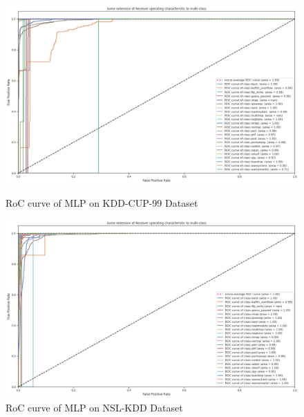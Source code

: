 \documentclass[conference]{IEEEtran}
\begin{document}
\clearpage
\begin{figure}[h]
  \centering
  \includegraphics[width=18cm]{MLP_KDD.png}
  \caption{RoC curve of MLP on KDD-CUP-99 Dataset}
  \label{MLP_KDD}
  \vspace*{\floatsep}%

  \includegraphics[width=18cm]{MLP_NSL.png}
  \caption{RoC curve of MLP on NSL-KDD Dataset}
  \label{MLP_NSL}
\end{figure}
\end{document}
